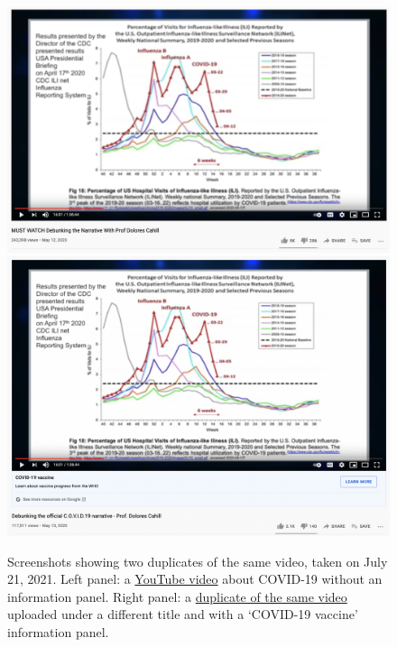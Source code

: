 \documentclass{article}
\begin{document}
\begin{figure}[h]
	\centering
		\begin{multicols}{1}
		\includegraphics[scale=0.24]{./img/youtube_panels/graph_no_banner.png}
		\includegraphics[scale=0.24]{./img/youtube_panels/graph_with_banner.png} 
		\end{multicols}
	\caption{Screenshots showing two duplicates of the same video, taken on July 21, 2021. 
Left panel: a \href{https://www.youtube.com/watch?v=d9GbVZOcT18}{YouTube video} about COVID-19 without an information panel. 	
Right panel: a \href{https://www.youtube.com/watch?v=A4RvrEKoNxc}{duplicate of the same video} uploaded under a different title and with a `COVID-19 vaccine' information panel.}
	\label{duplicates_yt}
\end{figure}
\end{document}
